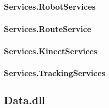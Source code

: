 \subsubsection{Services.RobotServices}

\subsubsection{Services.RouteService}

\subsubsection{Services.KinectServices}

\subsubsection{Services.TrackingServices}


\subsection{Data.dll}\label{arkitektur:data}







